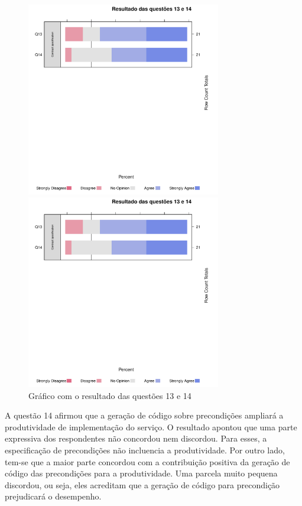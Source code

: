 \begin{figure}[!htb]
\centering
\includegraphics[width=85mm,trim = 6mm 115mm 6mm 
10mm,clip]{img/GraficoResultadoQuestoes13e14.pdf}

\includegraphics[width=85mm,trim = 6mm 0mm 6mm 
170mm,clip]{img/GraficoResultadoQuestoes13e14.pdf}

\caption{Gráfico com o resultado das questões 13 e 14}
\label{Respostas13e14}
\end{figure}

A questão 14 afirmou que a geração de código sobre precondições ampliará a
produtividade de implementação do serviço. O resultado apontou que uma parte
expressiva dos respondentes não concordou nem discordou. Para esses, a
especificação de precondições não incluencia a produtividade.
Por outro lado, tem-se que a maior parte concordou com a contribuição positiva
da geração de código das precondições para a produtividade. Uma parcela muito pequena discordou, ou seja,
eles acreditam que a geração de código para precondição prejudicará o
desempenho.


